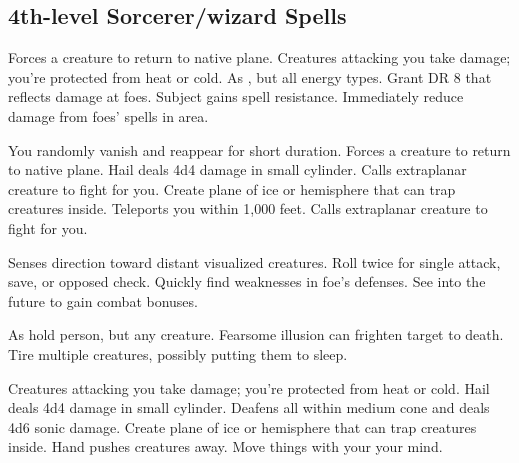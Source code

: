 \subsection{4th-level Sorcerer/wizard Spells} 
\begin{swspelllist}
   Forces a creature to return to native plane.
   Creatures attacking you take damage; you're protected from heat or cold.
   As , but all energy types.
   Grant DR 8 that reflects damage at foes.
   Subject gains spell resistance.
   Immediately reduce damage from foes' spells in area.
  \spellheadrestricted{}

   You randomly vanish and reappear for short duration.
   Forces a creature to return to native plane.
   Hail deals 4d4 damage in small cylinder.
   Calls extraplanar creature to fight for you.
   Create plane of ice or hemisphere that can trap creatures inside.
   Teleports you within 1,000 feet.
   Calls extraplanar creature to fight for you.

   Senses direction toward distant visualized creatures.
   Roll twice for single attack, save, or opposed check.
   Quickly find weaknesses in foe's defenses.
   See into the future to gain combat bonuses.

   As hold person, but any creature.
   Fearsome illusion can frighten target to death.
   Tire multiple creatures, possibly putting them to sleep.
  \spellheadrestricted{}
  \spellheadrestricted{}

   Creatures attacking you take damage; you're protected from heat or cold.
   Hail deals 4d4 damage in small cylinder.
   Deafens all within medium cone and deals 4d6 sonic damage.
   Create plane of ice or hemisphere that can trap creatures inside.
   Hand pushes creatures away.
   Move things with your your mind.


\end{swspelllist}
